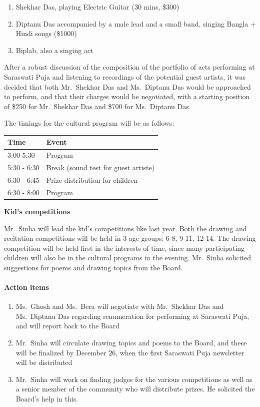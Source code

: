 \documentclass[12pt,]{article}
\providecommand{\tightlist}{%
  \setlength{\itemsep}{0pt}\setlength{\parskip}{0pt}}
\let\oldparagraph\paragraph
\renewcommand{\paragraph}[1]{\oldparagraph{#1}\mbox{}}
\begin{document}
\begin{enumerate}
\def\labelenumi{\arabic{enumi}.}
\tightlist
\item
  Shekhar Das, playing Electric Guitar (30 mins, \$300)
\item
  Diptanu Das accompanied by a male lead and a small band, singing
  Bangla + Hindi songs (\$1000)
\item
  Biplab, also a singing act
\end{enumerate}

After a robust discussion of the composition of the portfolio of acts
performing at Saraswati Puja and listening to recordings of the
potential guest artists, it was decided that both Mr.~Shekhar Das and
Ms.~Diptanu Das would be approached to perform, and that their charges
would be negotiated, with a starting position of \$250 for Mr.~Shekhar
Das and \$700 for Ms.~Diptanu Das.

The timings for the cultural program will be as follows:

\begin{longtable}[]{@{}ll@{}}
\toprule
Time & Event\tabularnewline
\midrule
\endhead
3:00-5:30 & Program\tabularnewline
5:30 - 6:30 & Break (sound test for guest artiste)\tabularnewline
6:30 - 6:45 & Prize distribution for children\tabularnewline
6:30 - 8:00 & Program\tabularnewline
\bottomrule
\end{longtable}

\textbf{Kid's competitions}

Mr.~Sinha will lead the kid's competitions like last year. Both the
drawing and recitation competitions will be held in 3 age groups: 6-8,
9-11, 12-14. The drawing competition will be held first in the interests
of time, since many participating children will also be in the cultural
programs in the evening. Mr.~Sinha solicited suggestions for poems and
drawing topics from the Board.

\hypertarget{action-items-3}{%
\paragraph{Action items}\label{action-items-3}}

\begin{enumerate}
\def\labelenumi{\arabic{enumi}.}
\tightlist
\item
  Ms.~Ghosh and Ms.~Bera will negotiate with Mr.~Shekhar Das and
  Ms.~Diptanu Das regarding renumeration for performing at Saraswati
  Puja, and will report back to the Board
\item
  Mr.~Sinha will circulate drawing topics and poems to the Board, and
  these will be finalized by December 26, when the first Saraswati Puja
  newsletter will be distributed
\item
  Mr.~Sinha will work on finding judges for the various competitions as
  well as a senior member of the community who will distribute prizes.
  He solicited the Board's help in this.
\end{enumerate}
\end{document}
